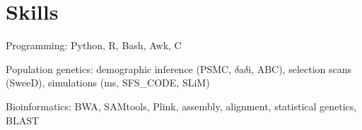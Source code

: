 \documentclass[letterpaper]{article}
\renewenvironment{itemize}{
  \begin{list}{}{
    \setlength{\leftmargin}{1em}
  }
}{
  \end{list}
}
\begin{document}
\section*{Skills}
\begin{itemize}
\item Programming: Python, R, Bash, Awk, C 
\item Population genetics: demographic inference (PSMC, $\delta$a$\delta$i, ABC), selection scans (SweeD), simulations (ms, SFS\_CODE, SLiM)
\item Bioinformatics: BWA, SAMtools, Plink, assembly, alignment, statistical genetics, BLAST

\end{itemize}
\end{document}
